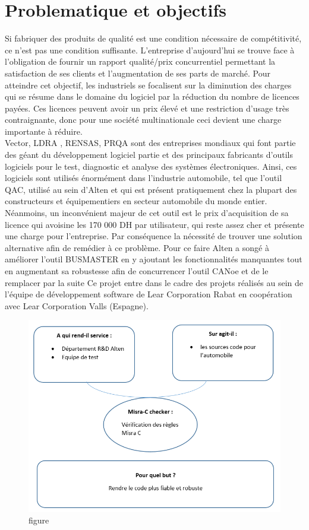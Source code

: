 \section{Problematique et objectifs}
Si fabriquer des produits de qualité est une condition nécessaire de compétitivité, ce n’est pas une condition suffisante. L’entreprise d’aujourd’hui se trouve face à l’obligation de fournir un rapport qualité/prix concurrentiel permettant la satisfaction de ses clients et l’augmentation de ses parts de marché. Pour atteindre cet objectif, les industriels se focalisent sur la diminution des charges qui se résume dans le domaine du logiciel par la réduction du nombre de licences payées. Ces licences peuvent avoir un prix élevé et une restriction d’usage très contraignante, donc pour une société multinationale ceci devient une charge importante à réduire.\\
Vector, LDRA , RENSAS, PRQA sont des entreprises mondiaux qui font partie des géant du développement logiciel partie et des principaux fabricants d’outils logiciels pour le test, diagnostic et analyse des systèmes électroniques. Ainsi, ces logiciels sont utilisés énormément dans l’industrie automobile, tel que l’outil QAC, utilisé au sein d’Alten et qui est présent pratiquement chez la plupart des constructeurs et équipementiers en secteur automobile du monde entier.\\
Néanmoins, un inconvénient majeur de cet outil est le prix d’acquisition de sa licence qui avoisine les 170 000 DH par utilisateur, qui reste assez cher et présente une charge pour l’entreprise. Par conséquence la nécessité de trouver une solution alternative afin de remédier à ce problème. Pour ce faire Alten a songé à améliorer l’outil BUSMASTER en y ajoutant les fonctionnalités manquantes tout en augmentant sa robustesse afin de concurrencer l’outil CANoe et de le remplacer par la suite Ce projet entre dans le cadre des projets réalisés au sein de l’équipe de développement software de Lear Corporation Rabat en coopération avec Lear Corporation Valls (Espagne). 
\begin{figure} [H]
\centering
\includegraphics[scale=0.5]{images/cap_7}
\caption{figure}
\end{figure}

